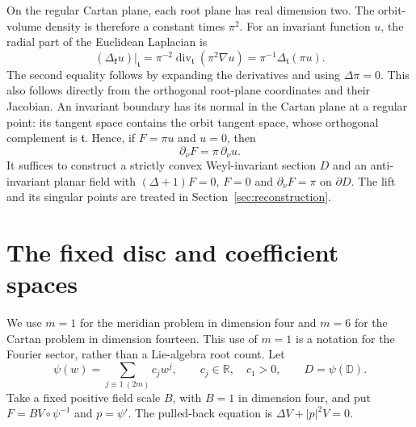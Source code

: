 \documentclass[11pt]{amsart}
\theoremstyle{remark}
\numberwithin{equation}{section}
\newcommand{\R}{\mathbb R}
\newcommand{\D}{\mathbb D}
\newcommand{\abs}[1]{\lvert#1\rvert}
\newcommand{\kf}{\mathfrak k}
\newcommand{\tf}{\mathfrak t}
\begin{document}
On the regular Cartan plane, each root plane has real dimension two.
The orbit-volume density is therefore a constant times $\pi^2$.
For an invariant function $u$, the radial part of the Euclidean
Laplacian is
\begin{equation}\label{eq:radialg2}
 (\Delta_\kf u)|_\tf
 =\pi^{-2}\operatorname{div}_\tf(\pi^2\nabla u)
 =\pi^{-1}\Delta_\tf(\pi u).
\end{equation}
The second equality follows by expanding the derivatives and using
$\Delta\pi=0$. This also follows directly from the orthogonal root-plane
coordinates and their Jacobian. An invariant boundary has its normal in
the Cartan plane at a regular point: its tangent space contains the
orbit tangent space, whose orthogonal complement is $\tf$. Hence, if
$F=\pi u$ and $u=0$, then
\begin{equation}\label{eq:fluxg2}
 \partial_\nu F=\pi\,\partial_\nu u.
\end{equation}
It suffices to construct a strictly convex Weyl-invariant section $D$
and an anti-invariant planar field with
$(\Delta+1)F=0$, $F=0$ and $\partial_\nu F=\pi$ on $\partial D$.
The lift and its singular points are treated in
Section~\ref{sec:reconstruction}.

\section{The fixed disc and coefficient spaces}\label{sec:disc}
We use $m=1$ for the meridian problem in dimension four and $m=6$
for the Cartan problem in dimension fourteen. This use of $m=1$ is a
notation for the Fourier sector, rather than a Lie-algebra root count.
Let
\[
 \psi(w)=\sum_{j\equiv1\ (2m)}c_jw^j,\qquad c_j\in\R,\quad c_1>0,
 \qquad D=\psi(\D).
\]
Take a fixed positive field scale $B$, with $B=1$ in dimension four, and
put $F=B V\circ\psi^{-1}$ and $p=\psi'$. The pulled-back equation is
$\Delta V+\abs p^2V=0$.
\end{document}
